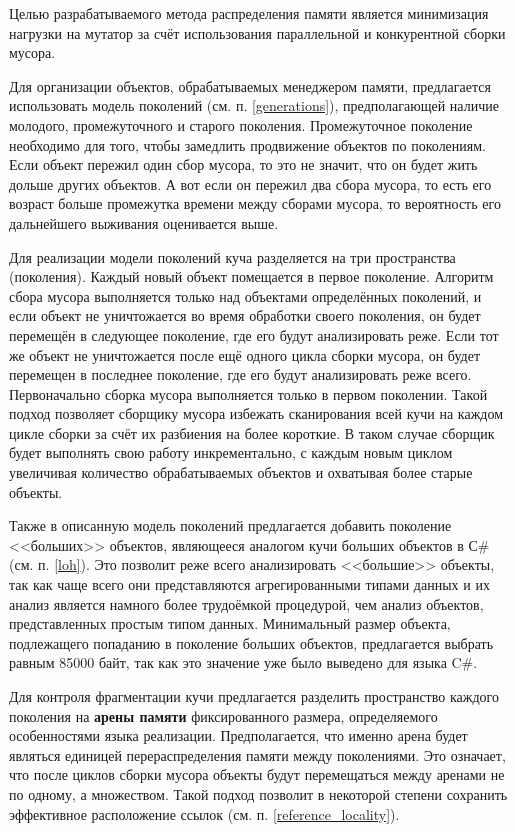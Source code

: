 Целью разрабатываемого метода распределения памяти является минимизация нагрузки на мутатор за счёт использования параллельной и конкурентной сборки мусора.

Для организации объектов, обрабатываемых менеджером памяти, предлагается использовать модель поколений (см. п. \ref{generations}), предполагающей наличие молодого, промежуточного и старого поколения. Промежуточное поколение необходимо для того, чтобы замедлить продвижение объектов по поколениям. Если объект пережил один сбор мусора, то это не значит, что он будет жить дольше других объектов. А вот если он пережил два сбора мусора, то есть его возраст больше промежутка времени между сборами мусора, то вероятность его дальнейшего выживания оценивается выше.

Для реализации модели поколений куча разделяется на три пространства (поколения). Каждый новый объект помещается в первое поколение. Алгоритм сбора мусора выполняется только над объектами определённых поколений, и если объект не уничтожается во время обработки своего поколения, он будет перемещён в следующее поколение, где его будут анализировать реже. Если тот же объект не уничтожается после ещё одного цикла сборки мусора, он будет перемещен в последнее поколение, где его будут анализировать реже всего. Первоначально сборка мусора выполняется только в первом поколении. Такой подход позволяет сборщику мусора избежать сканирования всей кучи на каждом цикле сборки за счёт их разбиения на более короткие. В таком случае сборщик будет выполнять свою работу инкрементально, с каждым новым циклом увеличивая количество обрабатываемых объектов и охватывая более старые объекты.

Также в описанную модель поколений предлагается добавить поколение <<больших>> объектов, являющееся аналогом кучи больших объектов в С\# (см. п. \ref{loh}). Это позволит реже всего анализировать <<большие>> объекты, так как чаще всего они представляются агрегированными типами данных и их анализ является намного более трудоёмкой процедурой, чем анализ объектов, представленных простым типом данных. Минимальный размер объекта, подлежащего попаданию в поколение больших объектов, предлагается выбрать равным 85000 байт, так как это значение уже было выведено для языка C\#.

Для контроля фрагментации кучи предлагается разделить пространство каждого поколения на \textbf{арены памяти} фиксированного размера, определяемого особенностями языка реализации. Предполагается, что именно арена будет являться единицей перераспределения памяти между поколениями. Это означает, что после циклов сборки мусора объекты будут перемещаться между аренами не по одному, а множеством. Такой подход позволит в некоторой степени сохранить эффективное расположение ссылок (см. п. \ref{reference_locality}).



